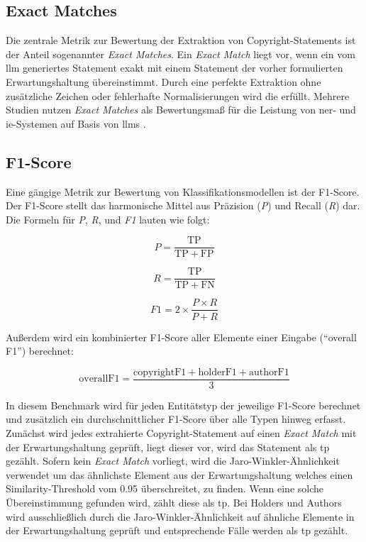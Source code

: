 \subsection{Exact Matches}
Die zentrale Metrik zur Bewertung der Extraktion von Copyright-Statements ist der Anteil sogenannter \textit{Exact Matches}.
Ein \textit{Exact Match} liegt vor, wenn ein vom \gls{llm} generiertes Statement exakt mit einem Statement der vorher formulierten Erwartungshaltung übereinstimmt.
Durch eine perfekte Extraktion ohne zusätzliche Zeichen oder fehlerhafte Normalisierungen wird die  erfüllt.
Mehrere Studien nutzen \textit{Exact Matches} als Bewertungsmaß für die Leistung von \gls{ner}- und \gls{ie}-Systemen auf Basis von \glspl{llm} \autocite{dunn_structured_2022}\autocite{hu_improving_2024}.

\subsection{F1-Score}
Eine gängige Metrik zur Bewertung von Klassifikationsmodellen ist der F1-Score\autocite{noauthor_f-score_2025}.
Der F1-Score stellt das harmonische Mittel aus Präzision (\textit{P}) und Recall (\textit{R}) dar.
Die Formeln für \textit{P}, \textit{R}, und \textit{F1} lauten wie folgt:

\[
 P = \frac{\mathrm{TP}}{\mathrm{TP} + \mathrm{FP}}
\]

\[
 R = \frac{\mathrm{TP}}{\mathrm{TP} + \mathrm{FN}}
\]

\[
 F1 = 2 \times \frac{P \times R}{P + R}
\]

Außerdem wird ein kombinierter F1-Score aller Elemente einer Eingabe (\enquote{overall F1}) berechnet:

\[
 \mathrm{overall F1} = \frac{\mathrm{copyrightF1} + \mathrm{holderF1} + \mathrm{authorF1}}{3}
\]

In diesem Benchmark wird für jeden Entitätstyp der jeweilige F1-Score berechnet und zusätzlich ein durchschnittlicher F1-Score über alle Typen hinweg erfasst.
Zunächst wird jedes extrahierte Copyright-Statement auf einen \textit{Exact Match} mit der Erwartungshaltung geprüft, liegt dieser vor, wird das Statement als \gls{tp} gezählt.
Sofern kein \textit{Exact Match} vorliegt, wird die Jaro-Winkler-Ähnlichkeit\autocite{noauthor_jarowinkler_nodate} verwendet um das ähnlichste Element aus der Erwartungshaltung welches einen Similarity-Threshold vom \num{0,95} überschreitet, zu finden.
Wenn eine solche Übereinstimmung gefunden wird, zählt diese als \gls{tp}.
Bei Holders und Authors wird ausschließlich durch die Jaro-Winkler-Ähnlichkeit auf ähnliche Elemente in der Erwartungshaltung geprüft und entsprechende Fälle werden als \gls{tp} gezählt.

